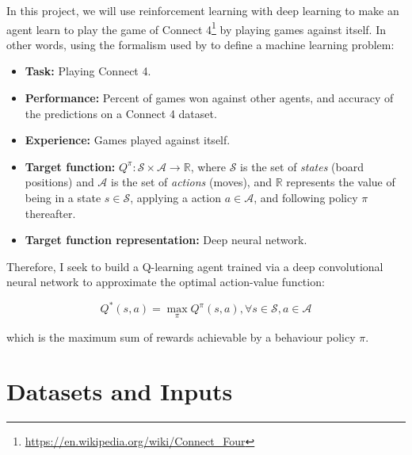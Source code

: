 \documentclass{article}
\begin{document}
\newcommand{\URLcf}{https://en.wikipedia.org/wiki/Connect_Four}

In this project, we will use reinforcement learning with deep learning to make an agent learn to
play the game of {Connect 4}\footnote{\url{\URLcf}} by playing games against itself. In other words,
using the formalism used by \cite{Mitchell1997Book} to define a machine learning problem:

\begin{itemize}

    \item \textbf{Task:} Playing Connect 4.

    \item \textbf{Performance:} Percent of games won against other agents, and accuracy of the
        predictions on a Connect 4 dataset.

    \item \textbf{Experience:} Games played against itself.

    \item \textbf{Target function:} $Q^\pi : \mathcal{S} \times \mathcal{A} \to \mathbb{R}$, where
        $\mathcal{S}$ is the set of \emph{states} (board positions) and $\mathcal{A}$ is the set of
        \emph{actions} (moves), and $\mathbb{R}$ represents the value of being in a state $s \in
        \mathcal{S}$, applying a action $a \in \mathcal{A}$, and following policy $\pi$ thereafter.

    \item \textbf{Target function representation:} Deep neural network.

\end{itemize}

Therefore, I seek to build a Q-learning agent trained via a deep convolutional neural network to
approximate the optimal action-value function:

\begin{equation}
Q^*(s,a) = \max\limits_\pi Q^\pi(s,a), \forall s \in \mathcal{S}, a \in \mathcal{A}
\end{equation}

\noindent which is the maximum sum of rewards achievable by a behaviour policy $\pi$.

\section{Datasets and Inputs}
\end{document}
